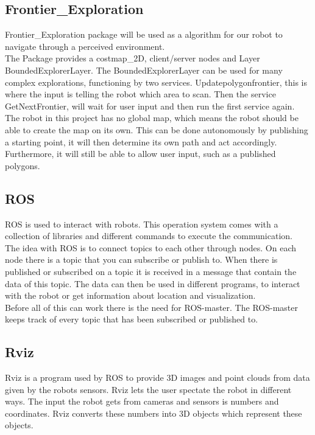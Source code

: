 \subsection{Frontier\_Exploration}
Frontier\_Exploration package will be used as a algorithm for our robot to navigate through a perceived environment.\\
The Package provides a costmap\_2D, client/server nodes and Layer BoundedExplorerLayer. The BoundedExplorerLayer can be used for many complex explorations, functioning by two services. Updatepolygonfrontier, this is where the input is telling the robot which area to scan. Then the service GetNextFrontier, will wait for user input and then run the first service again.\\
The robot in this project has no global map, which means the robot should be able to create the map on its own. This can be done autonomously by publishing a starting point, it will then determine its own path and act accordingly. Furthermore, it will still be able to allow user input, such as a published polygons\cite{ROSexploration}.\\

\subsection{ROS}
ROS is used to interact with robots. This operation system comes with a collection of libraries and different commands to execute the communication.\\
The idea with ROS is to connect topics to each other through nodes. On each node there is a topic that you can subscribe or publish to. When there is published or subscribed on a topic it is received in a message that contain the data of this topic. The data can then be used in different programs, to interact with the robot or get information about location and visualization. \\
Before all of this can work there is the need for ROS-master. The ROS-master keeps track of every topic that has been subscribed or published to\cite{ROSwiki}.\\

\subsection{Rviz}
Rviz is a program used by ROS to provide 3D images and point clouds from data given by the robots sensors. Rviz lets the user spectate the robot in different ways. The input the robot gets from cameras and sensors is numbers and coordinates. Rviz converts these numbers into 3D objects which represent these objects\cite{interactiveMarkers}.\\

